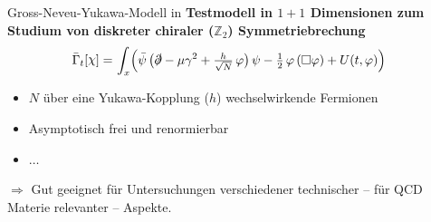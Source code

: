 \documentclass[10pt]{beamer}
\begin{document}
\begin{frame}{Gross-Neveu-Yukawa-Modell in }
	\textbf{Testmodell in $1+1$ Dimensionen zum Studium von diskreter chiraler ($\mathbb{Z}_2$) Symmetriebrechung}
	\begin{align*}
		\bar{\Gamma}_t [\chi] = \, &\intx[x]\!\!\, \Big( \bar{\psi} \, \big( \slashed{\partial} - \mu \gamma^2 + \tfrac{h}{\sqrt{N}} \, \varphi \big) \, \psi - \tfrac{1}{2} \, \varphi \, ( \Box \varphi ) + U ( t, \varphi ) \Big)
	\end{align*}\vspace{-.5cm}
	\begin{itemize}
		\item $N$ über eine Yukawa-Kopplung ($h$) wechselwirkende Fermionen
		\item Asymptotisch frei und renormierbar
		\item $\ldots$
	\end{itemize}
	$\Rightarrow$ Gut geeignet für Untersuchungen verschiedener technischer -- für QCD Materie relevanter -- Aspekte.
	
	
\end{frame}
\end{document}
